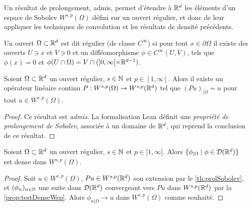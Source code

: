 
Un résultat de prolongement, admis, permet d'étendre à $\mathbb{R}^d$ les éléments d'un espace de Sobolev $W^{s,p}(\Omega)$ défini sur un ouvert régulier, et donc de leur appliquer les techniques de convolution et les résultats de densité précédents.


\begin{definition}
\label{def:ouvertReg}
	Un ouvert $\Omega \subset \mathbb{R}^d$ est dit régulier (de classe $C^\infty$) si pour tout $x \in \partial \Omega$ il existe des ouverts $U\ni x$ et $V \ni 0$ et un difféomorphisme $\phi \in C^\infty(U,V)$, tels que $\phi(x) = 0$ et $\phi(U \cap \Omega) = V \cap (]0,\infty[ \times \mathbb{R}^{d-1})$. 
\end{definition}

\begin{theorem}
\label{th:prolSobolev}
Soient $\Omega \subset \mathbb{R}^d$ un ouvert régulier, $s\in \mathbb{N}$ et $p \in [1,\infty]$. Alors il existe un opérateur linéaire continu $P : W^{s,p}(\Omega)\to W^{s,p}(\mathbb{R}^d)$ tel que $(P u)_{|\Omega} = u$ pour tout $u \in W^{s,p}(\Omega)$.  
\end{theorem}

\begin{proof}
	Ce résultat est \emph{admis}. La formalisation Lean définit une \emph{propriété de prolongement de Sobolev}, associée à un domaine de $\mathbb{R}^d$, qui reprend la conclusion de ce résultat.
\end{proof}



\begin{corollary}
\label{corol:testDenseWspO}
%
	Soient $\Omega \subset \mathbb{R}^d$ un ouvert régulier, $s \in \mathbb{N}$ et $p \in [1,\infty[$. Alors $\{\phi_{|\Omega} \mid \phi \in \mathcal{D}(\mathbb{R}^d)\}$ est dense dans $W^{s,p}(\Omega)$. 
\end{corollary}

\begin{proof}
	Soit $u\in W^{s,p}(\Omega)$, $Pu\in W^{s,p}(\mathbb{R}^d)$ son extension par le \cref{th:prolSobolev}, et $(\phi_n)_{n \in \mathbb{N}}$ une suite dans $\mathcal{D}(\mathbb{R}^d)$ convergeant vers $Pu$ dans $W^{s,p}(\mathbb{R}^d)$ par la \cref{prop:testDenseWsp}. Alors $\phi_{n|\Omega} \to u$ dans $W^{s,p}(\Omega)$ comme souhaité. 
\end{proof}

